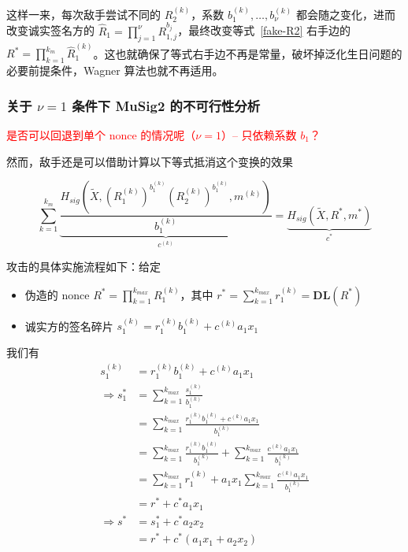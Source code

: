 \documentclass[a4paper,10pt]{article}
\begin{document}
这样一来，每次敌手尝试不同的 \(R_2^{(k)}\)，系数 \(b_1^{(k)},\dots,b_{\nu}^{(k)}\) 都会随之变化，进而改变诚实签名方的 \(\hat{R}_1=\prod_{j=1}^{\nu}R_{1,j}^{b_j}\)，最终改变等式~\eqref{fake-R2} 右手边的 \(R^*=\prod_{k=1}^{k_m} \hat{R}_1^{(k)}\)。这也就确保了等式右手边不再是常量，破坏掉泛化生日问题的必要前提条件，Wagner 算法也就不再适用。

\subsubsection{关于 \(\nu=1\) 条件下 MuSig2 的不可行性分析}

\textcolor{red}{是否可以回退到单个 nonce 的情况呢（\(\nu=1\)）-- 只依赖系数 \(b_1\)？}

然而，敌手还是可以借助计算以下等式抵消这个变换的效果

\begin{equation}
  \sum_{k=1}^{k_m} \underbrace{\frac{H_{sig}(\tilde{X},(R_1^{(k)})^{b_1^{(k)}}(R_2^{(k)})^{b_1^{(k)}},m^{(k)})}{b_1^{(k)}}}_{c^{(k)}} = \underbrace{H_{sig}(\tilde{X},R^*,m^*)}_{c^*} 
\end{equation}

攻击的具体实施流程如下：给定
\begin{itemize}
  \item 伪造的 nonce \(R^* = \prod_{k=1}^{k_{max}} R_1^{(k)}\)，其中 \(r^*=\sum_{k=1}^{k_{max}}r_1^{(k)} = \mathbf{DL}(R^*)\)
  \item 诚实方的签名碎片 \(s_1^{(k)}=r_1^{(k)}b_1^{(k)}+c^{(k)} a_1 x_1\)
\end{itemize}

我们有
\begin{align*}
  s_1^{(k)} &= r_1^{(k)}b_1^{(k)}+c^{(k)} a_1 x_1 \\
  \Rightarrow s_1^* &= \sum_{k=1}^{k_{max}} \frac{s_1^{(k)}}{b_1^{(k)}} \\
                    &= \sum_{k=1}^{k_{max}} \frac{r_1^{(k)}b_1^{(k)}+c^{(k)} a_1 x_1}{b_1^{(k)}} \\
                    &= \sum_{k=1}^{k_{max}} \frac{r_1^{(k)}b_1^{(k)}}{b_1^{(k)}} + \sum_{k=1}^{k_{max}} \frac{c^{(k)} a_1 x_1}{b_1^{(k)}} \\
                    &= \sum_{k=1}^{k_{max}} r_1^{(k)} + a_1 x_1 \sum_{k=1}^{k_{max}} \frac{c^{(k)} a_1 x_1}{b_1^{(k)}} \\
                    &= r^* + c^* a_1 x_1 \\
  \Rightarrow s^* &= s_1^* + c^* a_2 x_2 \\
                  &= r^* + c^* (a_1 x_1 + a_2 x_2)
\end{align*}
\end{document}
